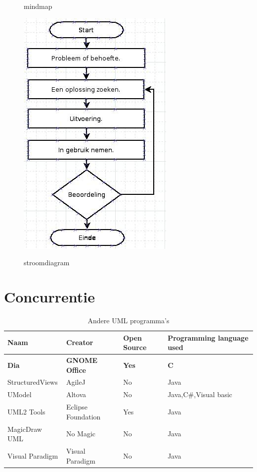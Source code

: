 \documentclass[12pt,a4paper]{report}
\begin{document}
\begin{flushleft}
\begin{figure}[H]
\label{voorbeeldschema_mindmap}
\centering 
\vspace{-10pt}
\caption{mindmap}
\end{figure}
\begin{figure}[H]
\includegraphics[scale=1]{images/voorbeeldschema_stroomdiagram.png}
\label{voorbeeldschema_stroomdiagram}
\centering 
\vspace{-10pt}
\caption{stroomdiagram}
\end{figure}
\section{Concurrentie}
\begin{table}
\begin{tabular}{|| l | l | l | p{3cm} ||}
\hline\hline
Naam & Creator & Open Source & Programming language used\\
\hline
\textbf{Dia} & \textbf{GNOME Office} &  \textbf{Yes} & \textbf{C}\\
StructuredViews & AgileJ & No & Java\\
UModel & Altova & No & Java,C\#,Visual basic\\
UML2 Tools & Eclipse Foundation & Yes & Java\\
MagicDraw UML & No Magic & No & Java\\
Visual Paradigm & Visual Paradigm & No & Java\\
\hline\hline
\end{tabular}
\centering
\caption{Andere UML programma's}
\end{table}




\end{flushleft}
\end{document}
